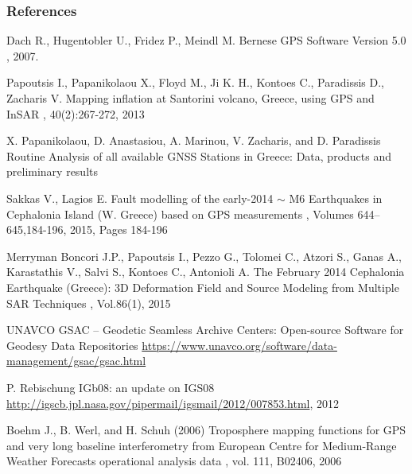 \documentclass{beamer}
\begin{document}
\begin{frame}[allowframebreaks]
  \frametitle<presentation>{References}
  \begin{thebibliography}{10}


  \beamertemplatearticlebibitems

    Dach R., Hugentobler U., Fridez P., Meindl M.
    \newblock Bernese GPS Software Version 5.0
    , 2007.

    Papoutsis I., Papanikolaou X., Floyd M., Ji K. H., Kontoes C., Paradissis D., Zacharis V.
    \newblock Mapping inflation at Santorini volcano, Greece, using GPS and InSAR
    , 40(2):267-272, 2013
    
     X. Papanikolaou, D. Anastasiou, A. Marinou, V. Zacharis, and D. Paradissis 
    \newblock Routine Analysis of all available GNSS Stations in Greece: Data, products and preliminary results


    Sakkas V., Lagios E.
    \newblock Fault modelling of the early-2014 $\sim$ M6 Earthquakes in Cephalonia Island (W. Greece) based on GPS measurements
    , Volumes 644–645,184-196, 2015, Pages 184-196

    Merryman Boncori J.P., Papoutsis I., Pezzo G., Tolomei C., Atzori S., Ganas A., Karastathis V., Salvi S., Kontoes C., Antonioli A.
    \newblock The February 2014 Cephalonia Earthquake (Greece): 3D Deformation Field and Source Modeling from Multiple SAR Techniques
    , Vol.86(1), 2015

    UNAVCO
    \newblock GSAC -- Geodetic Seamless Archive Centers: Open-source Software for Geodesy Data Repositories
     \url{https://www.unavco.org/software/data-management/gsac/gsac.html}

    P. Rebischung
    \newblock IGb08: an update on IGS08
     \url{http://igscb.jpl.nasa.gov/pipermail/igsmail/2012/007853.html}, 2012

    Boehm J., B. Werl, and H. Schuh (2006)
    \newblock Troposphere mapping functions for GPS and very long baseline interferometry from European Centre for
    Medium-Range Weather Forecasts operational analysis data
    , vol. 111, B02406, 2006

  \end{thebibliography}
\end{frame}
\end{document}
